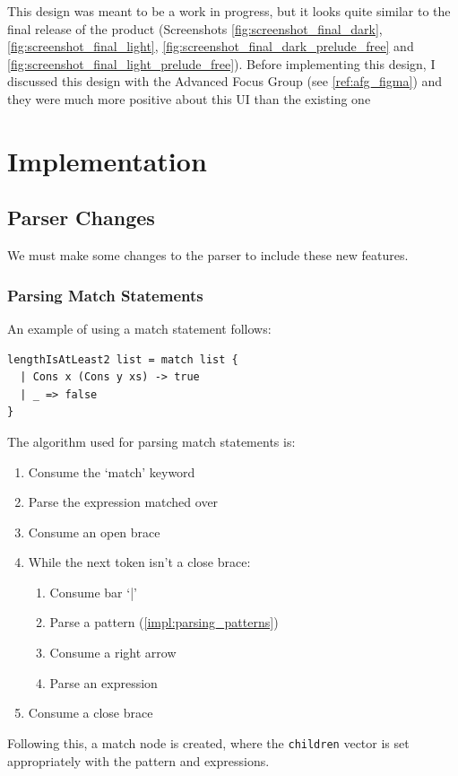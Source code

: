 This design was meant to be a work in progress, but it looks quite similar to the final release of the product (Screenshots \ref{fig:screenshot_final_dark}, \ref{fig:screenshot_final_light}, \ref{fig:screenshot_final_dark_prelude_free} and \ref{fig:screenshot_final_light_prelude_free}). Before implementing this design, I discussed this design with the Advanced Focus Group (see \ref{ref:afg_figma}) and they were much more positive about this UI than the existing one 
\\

\section{Implementation}
\subsection{Parser Changes}
We must make some changes to the parser to include these new features.

\subsubsection{Parsing Match Statements}
An example of using a match statement follows:
\begin{lstlisting}[language=SFL]
lengthIsAtLeast2 list = match list {
  | Cons x (Cons y xs) -> true
  | _ => false
}
\end{lstlisting}

The algorithm used for parsing match statements is:
\begin{enumerate}
    \item Consume the `match' keyword
    \item Parse the expression matched over
    \item Consume an open brace
    \item While the next token isn't a close brace: \begin{enumerate}
        \item Consume bar `|' 
        \item Parse a pattern (\ref{impl:parsing_patterns})
        \item Consume a right arrow
        \item Parse an expression
    \end{enumerate}
    \item Consume a close brace
\end{enumerate}
Following this, a match node is created, where the \verb|children| vector is set appropriately with the pattern and expressions.

